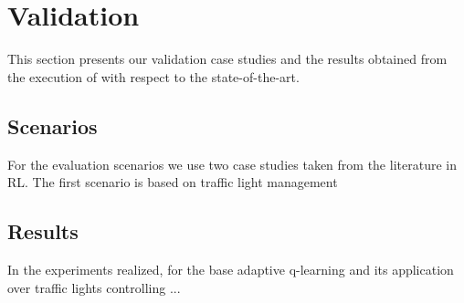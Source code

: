 
\section{Validation}
\label{sec:results}

This section presents our validation case studies and the results obtained from the execution of \adaptiverl with respect to the state-of-the-art.

\subsection{Scenarios}

For the evaluation scenarios we use two case studies taken from the literature in \ac{RL}. The first scenario is based on traffic light management~\cite{} 

\subsection{Results}

In the experiments realized, for the base adaptive q-learning and its application over traffic lights controlling ...



\endinput

